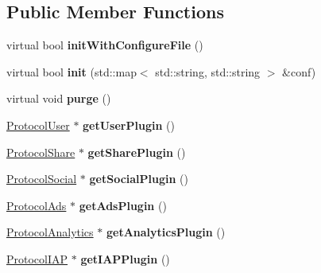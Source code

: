 \subsection*{Public Member Functions}
\begin{DoxyCompactItemize}
\item 
\mbox{\label{classcocos2d_1_1plugin_1_1AgentManager_afa7b739f14cedef4071726642fd273ce}} 
virtual bool {\bfseries init\+With\+Configure\+File} ()
\item 
\mbox{\label{classcocos2d_1_1plugin_1_1AgentManager_ac19f2d02a5bb52b2bac7d692fcdd5f97}} 
virtual bool {\bfseries init} (std\+::map$<$ std\+::string, std\+::string $>$ \&conf)
\item 
\mbox{\label{classcocos2d_1_1plugin_1_1AgentManager_a0502c25e2d87aed0390e813e8742e711}} 
virtual void {\bfseries purge} ()
\item 
\mbox{\label{classcocos2d_1_1plugin_1_1AgentManager_a72b4d3c14f5c0d5636dbe0705fadf8ab}} 
\hyperlink{classcocos2d_1_1plugin_1_1ProtocolUser}{Protocol\+User} $\ast$ {\bfseries get\+User\+Plugin} ()
\item 
\mbox{\label{classcocos2d_1_1plugin_1_1AgentManager_a58ad09cf72a818118f35d2780a374fc6}} 
\hyperlink{classcocos2d_1_1plugin_1_1ProtocolShare}{Protocol\+Share} $\ast$ {\bfseries get\+Share\+Plugin} ()
\item 
\mbox{\label{classcocos2d_1_1plugin_1_1AgentManager_a0fdece38ba6e96a09fa2d6c8121b046c}} 
\hyperlink{classcocos2d_1_1plugin_1_1ProtocolSocial}{Protocol\+Social} $\ast$ {\bfseries get\+Social\+Plugin} ()
\item 
\mbox{\label{classcocos2d_1_1plugin_1_1AgentManager_a1d4079727f00008ba48ac3c0b038efc1}} 
\hyperlink{classcocos2d_1_1plugin_1_1ProtocolAds}{Protocol\+Ads} $\ast$ {\bfseries get\+Ads\+Plugin} ()
\item 
\mbox{\label{classcocos2d_1_1plugin_1_1AgentManager_ab6bb11221f6339d38451ba69677c6532}} 
\hyperlink{classcocos2d_1_1plugin_1_1ProtocolAnalytics}{Protocol\+Analytics} $\ast$ {\bfseries get\+Analytics\+Plugin} ()
\item 
\mbox{\label{classcocos2d_1_1plugin_1_1AgentManager_a329fdac655e2d0e7b032b421583c914a}} 
\hyperlink{classcocos2d_1_1plugin_1_1ProtocolIAP}{Protocol\+I\+AP} $\ast$ {\bfseries get\+I\+A\+P\+Plugin} ()
\end{DoxyCompactItemize}

